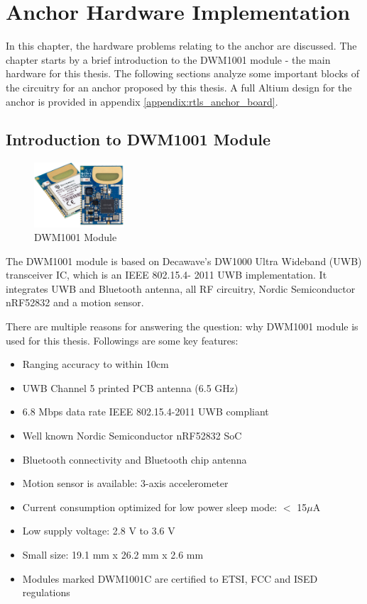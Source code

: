\documentclass[\main/thesis.tex]{subfiles}
\begin{document}
\graphicspath{{img/}{04_hardware/img/}}
\setlength{\abovecaptionskip}{0pt}
\setlength{\belowcaptionskip}{0pt}

\chapter{Anchor Hardware Implementation}
In this chapter, the hardware problems relating to the anchor are discussed. The chapter starts by a brief introduction to the DWM1001 module - the main hardware for this thesis. The following sections analyze some important blocks of the circuitry for an anchor proposed by this thesis. A full Altium design for the anchor is provided in appendix \ref{appendix:rtls_anchor_board}.

\section{Introduction to DWM1001 Module}
\begin{figure}[H]
    \begin{center}
        \includegraphics[width=0.3\textwidth]{DWM1001-Module_ProdPage_600x430.jpg}
    \end{center}
    \caption{DWM1001 Module}
    \label{fig:dwm1001c_module}
\end{figure}

The DWM1001 module is based on Decawave's DW1000 Ultra
Wideband (UWB) transceiver IC, which is an IEEE 802.15.4-
2011 UWB implementation. It integrates UWB and Bluetooth
antenna, all RF circuitry, Nordic Semiconductor nRF52832 and
a motion sensor.

There are multiple reasons for answering the question: why DWM1001 module is used for this thesis.
Followings are some key features:
\begin{itemize}
    \item Ranging accuracy to within 10cm
    \item UWB Channel 5 printed PCB antenna (6.5 GHz)
    \item 6.8 Mbps data rate IEEE 802.15.4-2011 UWB compliant
    \item Well known Nordic Semiconductor nRF52832 SoC
    \item Bluetooth connectivity and Bluetooth chip antenna
    \item Motion sensor is available: 3-axis accelerometer
    \item Current consumption optimized for low power sleep mode: $<$ 15$\mu$A
    \item Low supply voltage: 2.8 V to 3.6 V
    \item Small size: 19.1 mm x 26.2 mm x 2.6 mm
    \item Modules marked DWM1001C are certified to ETSI, FCC and ISED regulations
\end{itemize}
\end{document}
